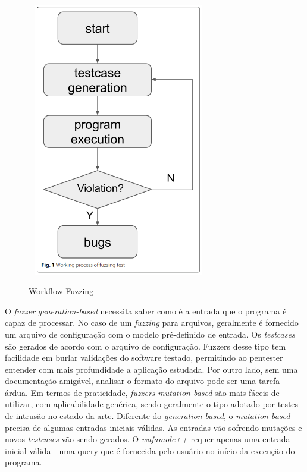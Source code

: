 \begin{figure}[ht]
    \centering
    \caption{Workflow Fuzzing}
    \includegraphics[width=8cm,height=12cm,keepaspectratio]{figuras/fuzzing imagem.png} 
    \label{fig:internet} 
\end{figure}

O \textit{fuzzer} \textit{generation-based} necessita saber como é a entrada que o programa é capaz de processar. No caso de um \textit{fuzzing} para arquivos, geralmente é fornecido um arquivo de configuração com o modelo pré-definido de entrada. Os \textit{testcases} são gerados de acordo com o arquivo de configuração. Fuzzers desse tipo tem facilidade em burlar validações do software testado, permitindo ao pentester entender com mais profundidade a aplicação estudada. Por outro lado, sem uma documentação amigável, analisar o formato do arquivo pode ser uma tarefa árdua.
Em termos de praticidade, \textit{fuzzers} \textit{mutation-based} são mais fáceis de utilizar, com aplicabilidade genérica, sendo geralmente o tipo adotado por testes de intrusão no estado da arte. Diferente do \textit{generation-based}, o \textit{mutation-based} precisa de algumas entradas iniciais válidas. As entradas vão sofrendo mutações e novos \textit{testcases} vão sendo gerados. O \textit{wafamole++} requer apenas uma entrada inicial válida - uma query que é fornecida pelo usuário no início da execução do programa.

